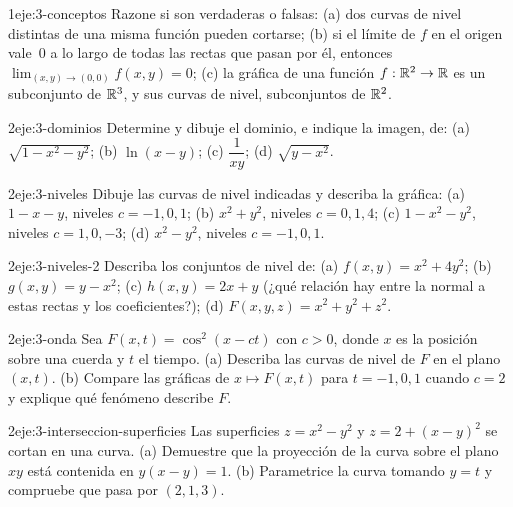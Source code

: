 \begin{ejercicio}{1}{eje:3-conceptos}
Razone si son verdaderas o falsas: (a) dos curvas de nivel distintas de una misma función pueden cortarse; (b) si el límite de $f$ en el origen vale~$0$ a lo largo de todas las rectas que pasan por él, entonces $\lim_{(x,y)\to(0,0)}f(x,y)=0$; (c) la gráfica de una función $f:\mathbb{R}^2\to\mathbb{R}$ es un subconjunto de $\mathbb{R}^3$, y sus curvas de nivel, subconjuntos de $\mathbb{R}^2$.
\end{ejercicio}

\begin{ejercicio}{2}{eje:3-dominios}
Determine y dibuje el dominio, e indique la imagen, de: (a) $\sqrt{1-x^2-y^2}$; (b) $\ln(x-y)$; (c) $\dfrac{1}{xy}$; (d) $\sqrt{y-x^2}$.
\end{ejercicio}

\begin{ejercicio}{2}{eje:3-niveles}
Dibuje las curvas de nivel indicadas y describa la gráfica: (a) $1-x-y$, niveles $c=-1,0,1$; (b) $x^2+y^2$, niveles $c=0,1,4$; (c) $1-x^2-y^2$, niveles $c=1,0,-3$; (d) $x^2-y^2$, niveles $c=-1,0,1$.
\end{ejercicio}

\begin{ejercicio}{2}{eje:3-niveles-2}
Describa los conjuntos de nivel de: (a) $f(x,y)=x^2+4y^2$; (b) $g(x,y)=y-x^2$; (c) $h(x,y)=2x+y$ (¿qué relación hay entre la normal a estas rectas y los coeficientes?); (d) $F(x,y,z)=x^2+y^2+z^2$.
\end{ejercicio}

\begin{ejercicio}{2}{eje:3-onda}
Sea $F(x,t)=\cos^2(x-ct)$ con $c>0$, donde $x$ es la posición sobre una cuerda y $t$ el tiempo. (a) Describa las curvas de nivel de $F$ en el plano $(x,t)$. (b) Compare las gráficas de $x\mapsto F(x,t)$ para $t=-1,0,1$ cuando $c=2$ y explique qué fenómeno describe $F$.
\end{ejercicio}

\begin{ejercicio}{2}{eje:3-interseccion-superficies}
Las superficies $z=x^2-y^2$ y $z=2+(x-y)^2$ se cortan en una curva. (a) Demuestre que la proyección de la curva sobre el plano $xy$ está contenida en $y(x-y)=1$. (b) Parametrice la curva tomando $y=t$ y compruebe que pasa por $(2,1,3)$.
\end{ejercicio}

